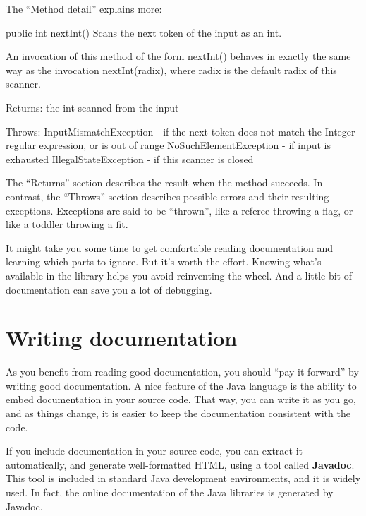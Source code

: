 The ``Method detail'' explains more:

\begin{stdout}
public int nextInt()
Scans the next token of the input as an int.

An invocation of this method of the form nextInt() behaves in
exactly the same way as the invocation nextInt(radix), where
radix is the default radix of this scanner.

Returns:
the int scanned from the input

Throws:
InputMismatchException - if the next token does not match
    the Integer regular expression, or is out of range
NoSuchElementException - if input is exhausted
IllegalStateException - if this scanner is closed
\end{stdout}

The ``Returns'' section describes the result when the method succeeds.
In contrast, the ``Throws'' section describes possible errors and their resulting exceptions.
Exceptions are said to be ``thrown'', like a referee throwing a flag, or like a toddler throwing a fit.

It might take you some time to get comfortable reading documentation and learning which parts to ignore.
But it's worth the effort.
Knowing what's available in the library helps you avoid reinventing the wheel.
And a little bit of documentation can save you a lot of debugging.


\section{Writing documentation}
\label{sec:javadoc}

As you benefit from reading good documentation, you should ``pay it forward'' by writing good documentation.
A nice feature of the Java language is the ability to embed documentation in your source code.
That way, you can write it as you go, and as things change, it is easier to keep the documentation consistent with the code.


If you include documentation in your source code, you can extract it automatically, and generate well-formatted HTML, using a tool called {\bf Javadoc}.
This tool is included in standard Java development environments, and it is widely used.
In fact, the online documentation of the Java libraries is generated by Javadoc.


